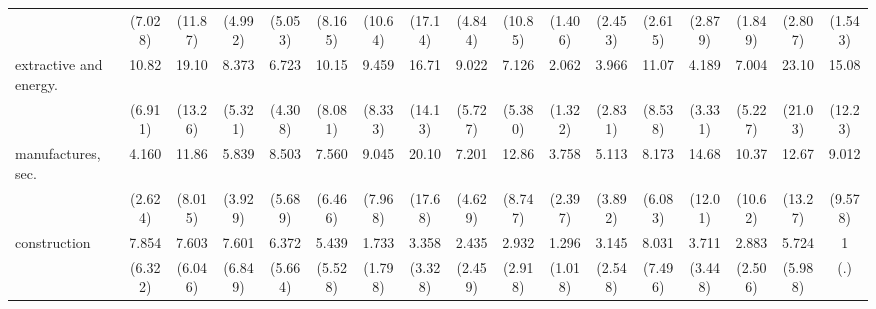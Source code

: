 {\begin{tabular}{l*{16}{c}}
                    &     (7.028)         &     (11.87)         &     (4.992)         &     (5.053)         &     (8.165)         &     (10.64)         &     (17.14)         &     (4.844)         &     (10.85)         &     (1.406)         &     (2.453)         &     (2.615)         &     (2.879)         &     (1.849)         &     (2.807)         &     (1.543)         \\
[1em]
extractive and energy.&       10.82\sym{***}&       19.10\sym{***}&       8.373\sym{***}&       6.723\sym{**} &       10.15\sym{**} &       9.459\sym{*}  &       16.71\sym{***}&       9.022\sym{***}&       7.126\sym{**} &       2.062         &       3.966         &       11.07\sym{**} &       4.189         &       7.004\sym{**} &       23.10\sym{***}&       15.08\sym{***}\\
                    &     (6.911)         &     (13.26)         &     (5.321)         &     (4.308)         &     (8.081)         &     (8.333)         &     (14.13)         &     (5.727)         &     (5.380)         &     (1.322)         &     (2.831)         &     (8.538)         &     (3.331)         &     (5.227)         &     (21.03)         &     (12.23)         \\
[1em]
manufactures, sec.  &       4.160\sym{*}  &       11.86\sym{***}&       5.839\sym{**} &       8.503\sym{**} &       7.560\sym{*}  &       9.045\sym{*}  &       20.10\sym{***}&       7.201\sym{**} &       12.86\sym{***}&       3.758\sym{*}  &       5.113\sym{*}  &       8.173\sym{**} &       14.68\sym{**} &       10.37\sym{*}  &       12.67\sym{*}  &       9.012\sym{*}  \\
                    &     (2.624)         &     (8.015)         &     (3.929)         &     (5.689)         &     (6.466)         &     (7.968)         &     (17.68)         &     (4.629)         &     (8.747)         &     (2.397)         &     (3.892)         &     (6.083)         &     (12.01)         &     (10.62)         &     (13.27)         &     (9.578)         \\
[1em]
construction        &       7.854\sym{*}  &       7.603\sym{*}  &       7.601\sym{*}  &       6.372\sym{*}  &       5.439         &       1.733         &       3.358         &       2.435         &       2.932         &       1.296         &       3.145         &       8.031\sym{*}  &       3.711         &       2.883         &       5.724         &           1         \\
                    &     (6.322)         &     (6.046)         &     (6.849)         &     (5.664)         &     (5.528)         &     (1.798)         &     (3.328)         &     (2.459)         &     (2.918)         &     (1.018)         &     (2.548)         &     (7.496)         &     (3.448)         &     (2.506)         &     (5.988)         &         (.)         \\

\end{tabular}}
